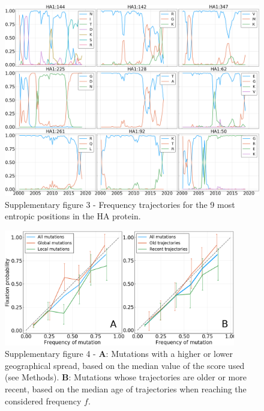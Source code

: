 \documentclass{article}
\begin{document}
	\begin{figure}
		\centering
		\includegraphics[scale=0.25]{Figures/sample_trajectories.png}
		\caption{Supplementary figure 3 - Frequency trajectories for the 9 most entropic positions in the HA protein.}
		\label{fig:sample_trajectories}
	\end{figure}

	\begin{figure}
		\centering
		\includegraphics[width=0.9\textwidth]{SM_figures/geospread_and_time.png}
		\caption{Supplementary figure 4 - \textbf{A}: Mutations with a higher or lower geographical spread, based on the median value of the score used (see Methods). \textbf{B}: Mutations whose trajectories are older or more recent, based on the median age of trajectories when reaching the considered frequency $f$.}
		\label{fig:geospread_and_time}
	\end{figure}
\end{document}
